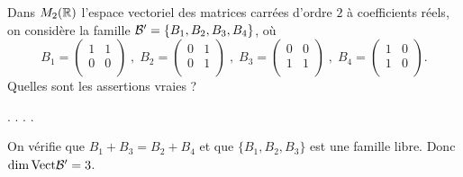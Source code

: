 \begin{question}
Dans $M_2(\mathbb{R})$ l'espace vectoriel des matrices carrées d'ordre $2$ à coefficients réels, on considère la famille ${\cal {B'}}= \{ B_1,B_2,B_3,B_4\}$, où 
$$ B_1 = \left(\begin{array}{rc}1&1\\
0&0\\ \end{array}\right) \; , \; B_2 = \left(\begin{array}{rc}
0&1\\0&1\\ 
\end{array}\right) \; , \; B_3 = \left(\begin{array}{rc}
0&0\\1&1\\ 
\end{array}\right) \; ,\; B_4 = \left(\begin{array}{rc}
1&0\\1&0\\ 
\end{array}\right).$$
Quelles sont les assertions vraies ?
\begin{answers}  
.
.
.
.
\end{answers}
\begin{explanations} On vérifie que $B_1+B_3=B_2+B_4$ et que $\{B_1,B_2,B_3\}$ est une famille libre. Donc 
$\dim \mbox{Vect} {\cal {B'}}=3$.
\end{explanations}
\end{question}

